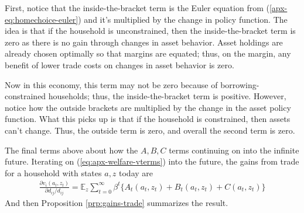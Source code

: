 \documentclass[12pt,pdftex]{article}
\begin{document}
\begin{onehalfspacing}
\begin{itemize}
    First, notice that the inside-the-bracket term is the Euler equation from (\ref{apx-eq:homechoice-euler}) and it's multiplied by the change in policy function. The idea is that if the household is unconstrained, then the inside-the-bracket term is zero as there is no gain through changes in asset behavior. Asset holdings are already chosen optimally so that margins are equated; thus, on the margin, any benefit of lower trade costs on changes in asset behavior is zero. 

    Now in this economy, this term may not be zero because of borrowing-constrained households; thus, the inside-the-bracket term is positive. However, notice how the outside brackets are multiplied by the change in the asset policy function. What this picks up is that if the household is constrained, then assets can't change. Thus, the outside term is zero, and overall the second term is zero.
\end{itemize}
The final terms above about how the $A, B, C$ terms continuing on into the infinite future. Iterating on (\ref{eq:apx-welfare-vterms}) into the future, the gains from trade for a household with states $a,z$ today are
\begin{align}
\frac{\partial v_i(a_{t}, z_{t})}{\partial d_{ij} / d_{ij}} = \mathbb{E}_{z} \sum_{t = 0}^{\infty} \beta^{t} \bigg \{ A_{t}(a_{t},z_{t}) + B_{t}(a_{t},z_{t}) + C(a_{t},z_{t}) \bigg \}
\label{eq:apx-welfare-v}
\end{align}
And then Proposition \ref{prp:gains-trade} summarizes the result.



\end{onehalfspacing}
\end{document}
